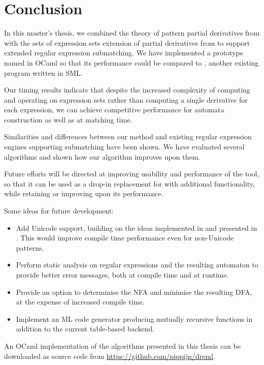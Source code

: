 \chapter{Conclusion}
\label{conclusion}

In this master's thesis, we combined the theory of pattern partial derivatives
from \cite{pdpat} with the sets of expression sets extension of partial
derivatives from \cite{pdere} to support extended regular expression
submatching. We have implemented a prototype named \dreml{} in OCaml so that its
performance could be compared to \mlulex, another existing program written in
SML.

Our timing results indicate that despite the increased complexity of computing
and operating on expression sets rather than computing a single derivative for
each expression, we can achieve competitive performance for automata
construction as well as at matching time.

Similarities and differences between our method and existing regular expression
engines supporting submatching have been shown. We have evaluated several
algorithms and shown how our algorithm improves upon them.

Future efforts will be directed at improving usability and performance of the
tool, so that it can be used as a drop-in replacement for \ocamllex{} with
additional functionality, while retaining or improving upon its performance.

Some ideas for future development:

\begin{itemize}

   \item Add Unicode support, building on the ideas implemented in \mlulex{} and
      presented in \cite{re-deriv}. This would improve compile time performance
      even for non-Unicode patterns.

   \item Perform static analysis on regular expressions and the resulting
      automaton to provide better error messages, both at compile time and at
      runtime.

   \item Provide an option to determinise the NFA and minimise the resulting
      DFA, at the expense of increased compile time.

   \item Implement an ML code generator producing mutually recursive functions
      in addition to the current table-based backend.

\end{itemize}

An OCaml implementation of the algorithms presented in this thesis can be
downloaded as source code from \url{https://github.com/pippijn/dreml}.



